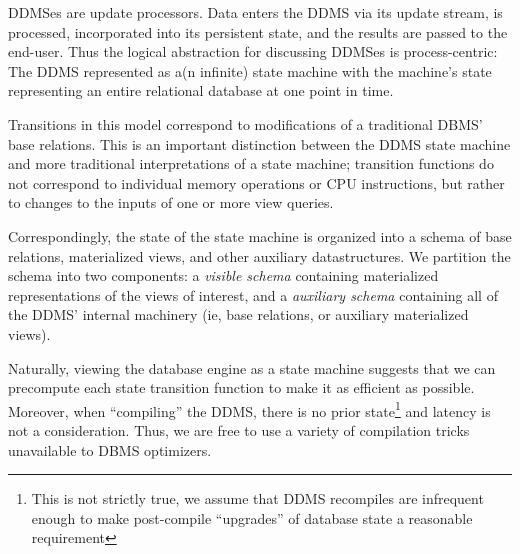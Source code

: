 

DDMSes are update processors.  Data enters the DDMS via its update stream, is
processed, incorporated into its persistent state, and the results are passed to
the end-user.  Thus the logical abstraction for discussing DDMSes is
process-centric: The DDMS represented as a(n infinite) state machine with the
machine's state representing an entire relational database at one point in time.


Transitions in this model correspond to modifications of a traditional DBMS'
base relations.  This is an important distinction between the DDMS state machine
and more traditional interpretations of a state machine; transition functions do
not correspond to individual memory operations or CPU instructions, but rather
to changes to the inputs of one or more view queries.


Correspondingly, the state of the state machine is organized into a schema of
base relations, materialized views, and other auxiliary datastructures.  We
partition the schema into two components: a \textit{visible schema} containing
materialized representations of the views of interest, and a \textit{auxiliary
schema} containing all of the DDMS' internal machinery (ie, base relations, or
auxiliary materialized views).

Naturally, viewing the database engine as a state machine suggests that we can
precompute each state transition function to make it as efficient as possible. 
Moreover, when ``compiling'' the DDMS, there is no prior state\footnote{This is
not strictly true, we assume that DDMS recompiles are infrequent enough to make
post-compile ``upgrades'' of database state a reasonable requirement} and
latency is not a consideration.  Thus, we are free to use a variety of
compilation tricks unavailable to DBMS optimizers.



